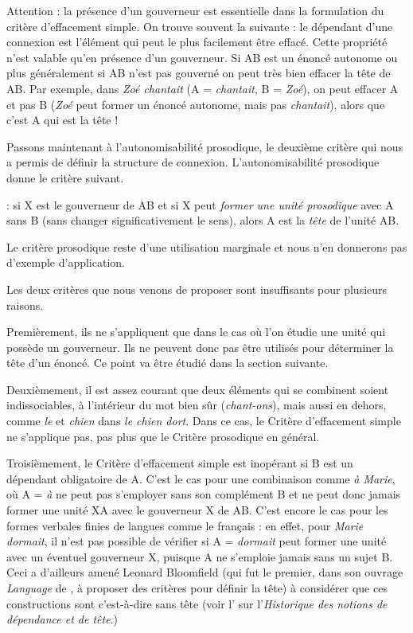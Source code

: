 Attention : la présence d’un gouverneur est essentielle dans la formulation du  critère d’effacement simple. On trouve souvent la  suivante : le dépendant d’une connexion est l’élément qui peut le plus facilement être effacé. Cette propriété n’est valable qu’en présence d’un gouverneur. Si AB est un énoncé autonome ou plus généralement si AB n’est pas gouverné on peut très bien effacer la tête de AB. Par exemple, dans \textit{Zoé chantait} (A = \textit{chantait}, B = \textit{Zoé}), on peut effacer A et pas B (\textit{Zoé} peut former un énoncé autonome, mais pas \textit{chantait}), alors que c’est A qui est la tête !

Passons maintenant à l’autonomisabilité prosodique, le deuxième critère qui nous a permis de définir la structure de connexion. L’autonomisabilité prosodique donne le critère suivant.

{: si X est le gouverneur de AB et si X {peut \textit{former une unité prosodique} avec} A sans B (sans changer significativement le sens), alors A est {la \textit{tête} de l’unité} AB.}

Le critère prosodique reste d'une utilisation marginale et nous n'en donnerons pas d'exemple d'application.

Les deux critères que nous venons de proposer sont insuffisants pour plusieurs raisons.

Premièrement, ils ne s’appliquent que dans le cas où l’on étudie une unité qui possède un gouverneur. Ils ne peuvent donc pas être utilisés pour déterminer la tête d’un énoncé. Ce point va être étudié dans la section suivante.

Deuxièmement, il est assez courant que deux éléments qui se combinent soient indissociables, à l’intérieur du mot bien sûr (\textit{chant-ons}), mais aussi en dehors, comme \textit{le} et \textit{chien} dans \textit{le chien dort}. Dans ce cas, le Critère d’effacement simple ne s’applique pas, pas plus que le Critère prosodique en général.

Troisièmement, le Critère d’effacement simple est inopérant si B est un dépendant obligatoire de A. C’est le cas pour une combinaison comme \textit{à Marie}, où A = \textit{à} ne peut pas s’employer sans son complément B et ne peut donc jamais former une unité XA avec le gouverneur X de AB. C’est encore le cas pour les formes verbales finies de langues comme le français : en effet, pour \textit{Marie dormait}, il n’est pas possible de vérifier si A = \textit{dormait} peut former une unité avec un éventuel gouverneur X, puisque A ne s’emploie jamais sans un sujet B. Ceci a d’ailleurs amené Leonard Bloomfield (qui fut le premier, dans son ouvrage \textit{Language} de \citeyear{bloomfield1933language}, à proposer des critères pour définir la tête) à considérer que ces constructions sont  c’est-à-dire sans tête (voir l' sur l'\textit{Historique des notions de dépendance et de tête}.)

